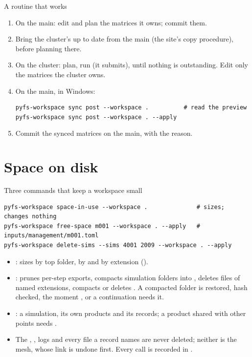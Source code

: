 \begin{frame}[fragile]{A routine that works}
\begin{enumerate}\small
  \item On the main: edit and plan the matrices it owns; commit them.
  \item Bring the cluster's  up to date from the main (the
        site's copy procedure), before planning there.
  \item On the cluster: plan, run (it submits),  until
        nothing is outstanding. Edit only the matrices the cluster owns.
  \item On the main, in Windows:
\begin{lstlisting}[style=ftsbase]
pyfs-workspace sync post --workspace .          # read the preview
pyfs-workspace sync post --workspace . --apply
\end{lstlisting}
  \item Commit the synced matrices on the main, with the reason.
\end{enumerate}
\end{frame}

\section{Space on disk}
\label{sec:storage}

\begin{frame}[fragile]{Three commands that keep a workspace small}
\begin{lstlisting}[style=ftsbase]
pyfs-workspace space-in-use --workspace .              # sizes; changes nothing
pyfs-workspace free-space m001 --workspace . --apply   # inputs/management/m001.toml
pyfs-workspace delete-sims --sims 4001 2009 --workspace . --apply
\end{lstlisting}
\begin{itemize}\small
  \item {}: sizes by top folder, by  and by
        extension ().
  \item {}: prunes per-step exports, compacts simulation folders into
        , deletes files of named extensions, compacts
        or deletes . A compacted folder is
        restored, hash checked, the moment ,  or a
        continuation needs it.
  \item {}: a simulation, its own products and its records;
        a product shared with other points needs .
  \item The , , logs and every file a record names
        are never deleted; neither is the mesh, whose link is undone first.
        Every call is recorded in .
\end{itemize}
\end{frame}

